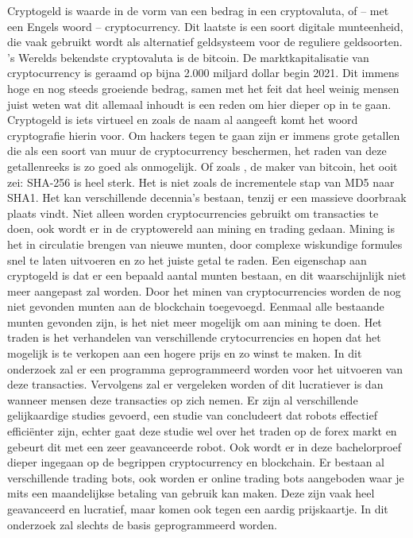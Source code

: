 Cryptogeld is waarde in de vorm van een bedrag in een cryptovaluta, of – met een Engels woord – cryptocurrency. Dit laatste is een soort digitale munteenheid, die vaak gebruikt wordt als alternatief geldsysteem voor de reguliere geldsoorten. 's Werelds bekendste cryptovaluta is de bitcoin. De marktkapitalisatie van cryptocurrency is geraamd op bijna 2.000 miljard dollar begin 2021. \autocite{Wikipedia2022} Dit immens hoge en nog steeds groeiende bedrag, samen met het feit dat heel weinig mensen juist weten wat dit allemaal inhoudt is een reden om hier dieper op in te gaan. Cryptogeld is iets virtueel en zoals de naam al aangeeft komt het woord cryptografie hierin voor. Om hackers tegen te gaan zijn er immens grote getallen die als een soort van muur de cryptocurrency beschermen, het raden van deze getallenreeks is zo goed als onmogelijk. Of zoals \textcite{Nakamoto2010}, de maker van bitcoin, het ooit zei: SHA-256 is heel sterk.  Het is niet zoals de incrementele stap van MD5 naar SHA1. Het kan verschillende decennia’s bestaan, tenzij er een massieve doorbraak plaats vindt. Niet alleen worden cryptocurrencies gebruikt om transacties te doen, ook wordt er in de cryptowereld aan mining en trading gedaan. Mining is het in circulatie brengen van nieuwe munten, door complexe wiskundige formules snel te laten uitvoeren en zo het juiste getal te raden. Een eigenschap aan cryptogeld is dat er een bepaald aantal munten bestaan, en dit waarschijnlijk niet meer aangepast zal worden. Door het minen van cryptocurrencies worden de nog niet gevonden munten aan de blockchain toegevoegd. Eenmaal alle bestaande munten gevonden zijn, is het niet meer mogelijk om aan mining te doen. Het traden is het verhandelen van verschillende crytocurrencies en hopen dat het mogelijk is te verkopen aan een hogere prijs en zo winst te maken. In dit onderzoek zal er een programma geprogrammeerd worden voor het uitvoeren van deze transacties. Vervolgens zal er vergeleken worden of dit lucratiever is dan wanneer mensen deze transacties op zich nemen. Er zijn al verschillende gelijkaardige studies gevoerd, een studie van \textcite{MarliDamiaoAbade2021} concludeert dat robots effectief efficiënter zijn, echter gaat deze studie wel over het traden op de forex markt en gebeurt dit met een zeer geavanceerde robot. Ook wordt er in deze bachelorproef dieper ingegaan op de begrippen cryptocurrency en blockchain. Er bestaan al verschillende trading bots, ook worden er online trading bots aangeboden waar je mits een maandelijkse betaling van gebruik kan maken. Deze zijn vaak heel geavanceerd en lucratief, maar komen ook tegen een aardig prijskaartje. In dit onderzoek zal slechts de basis geprogrammeerd worden.


